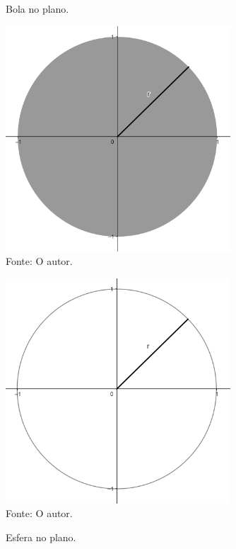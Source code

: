     \begin{figure}[htb!]
        \begin{minipage}[c]{0.5\linewidth}
            \centering
            \caption{Bola no plano.}
            \includegraphics[width=0.75\textwidth]{Figuras/bola.png}\\
            \footnotesize{Fonte: O autor.}
            \label{fig:bola}
        \end{minipage}\hfill
        \begin{minipage}[c]{0.5\linewidth}
            \centering
            \caption{Esfera no plano.}
            \includegraphics[width=0.75\textwidth]{Figuras/esfera.png}\\
            \footnotesize{Fonte: O autor.}
            \label{fig:esfera}
        \end{minipage}
    \end{figure}

